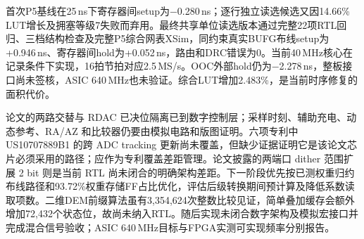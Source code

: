 \documentclass[UTF8,fontset=fandol,11pt,a4paper,openany]{ctexrep}
\begin{document}
首次P5基线在25\,ns下寄存器间setup为−0.280\,ns；逐行独立读选候选又因14.66\% LUT增长及拥塞等级7失败而弃用。最终共享单位读选版本通过完整22项RTL回归、三档结构检查及完整P5综合网表XSim，同约束真实BUFG布线setup为+0.946\,ns、寄存器间hold为+0.052\,ns，路由和DRC错误为0。当前40\,MHz核心在记录条件下实现，16拍节拍对应2.5\,MS/s。OOC外部hold仍为−2.278\,ns，整板接口尚未签核，ASIC 640\,MHz也未验证。综合LUT增加2.483\%，是当前时序修复的面积代价。

论文的两路交替与 RDAC 已决位隔离已到数字控制层；采样时刻、辅助充电、动态参考、RA/AZ 和比较器仍要由模拟电路和版图证明。六项专利中 US10707889B1 的跨 ADC tracking 更新尚未覆盖，但缺少证据证明它是该论文芯片必须采用的路径；应作为专利覆盖差距管理。论文披露的两端口 dither 范围扩展 2 bit 则是当前 RTL 尚未闭合的明确架构差距。下一阶段优先按已测权重归约布线路径和93.72\%权重存储FF占比优化，评估后级转换期间预计算及降低系数读取项数。二维DEM前缀算法虽有3,354,624次整数比较见证，简单叠加缓存会额外增加72,432个状态位，故尚未纳入RTL。随后实现未闭合数字架构及模拟宏接口并完成混合信号验收；ASIC 640\,MHz目标与FPGA实测可实现频率分别报告。

\appendix
\end{document}
